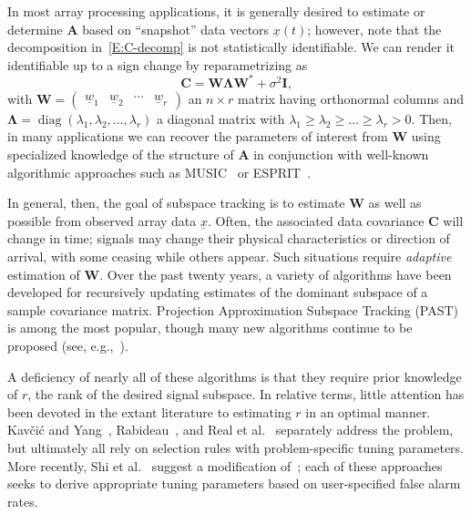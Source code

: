 \documentclass[final]{IEEEtran}
\newcommand{\vectorsymbol}{\underline}
\newcommand{\matrixsymbol}{\boldsymbol}
\newcommand{\mA}{\matrixsymbol{A}}
\newcommand{\mC}{\matrixsymbol{C}}
\newcommand{\mI}{\matrixsymbol{I}}
\newcommand{\mW}{\matrixsymbol{W}}
\newcommand{\mLambda}{\matrixsymbol{\Lambda}}
\newcommand{\vw}{\vectorsymbol{w}}
\newcommand{\vx}{\vectorsymbol{x}}
\DeclareMathOperator*{\diag}{diag}
\begin{document}
In most array processing applications, it is generally desired to estimate or determine $\mA$ based on ``snapshot'' data vectors $\vx(t)$; however, note that the decomposition in~\eqref{E:C-decomp} is not statistically identifiable.  We can render it identifiable up to a sign change by reparametrizing as
\begin{equation}\label{E:C-decomp-eig}
    \mC
    =
    \mW \mLambda \mW^* + \sigma^2 \mI,
\end{equation}
with
\(
    \mW
    =
    \left(
    \begin{matrix}
        \vw_1 & \vw_2 & \cdots & \vw_r
    \end{matrix}
    \right)
\)
an $n \times r$ matrix having orthonormal columns and
\(
    \mLambda
    =
    \diag(
        \lambda_1, \lambda_2, \ldots, \lambda_r
    )
\)
a diagonal matrix with
\(
    \lambda_1 \geq \lambda_2 \geq \dots \geq \lambda_r > 0.
\)
Then, in many applications we can recover the parameters of interest from
$\mW$ using specialized knowledge of the structure of $\mA$ in conjunction with well-known algorithmic approaches
such as MUSIC~\cite{schmidt1986mel} or ESPRIT~\cite{roy1989ees}.

In general, then, the goal of subspace tracking is to estimate $\mW$ as well as
possible from observed array data $\vx$.  Often, the associated data covariance $\mC$ will change in time; signals may change their physical characteristics or direction of arrival, with some ceasing while others appear.  Such situations require \emph{adaptive} estimation of $\mW$.  Over the past twenty years, a variety of algorithms
have been developed for recursively updating estimates of the dominant subspace
of a sample covariance matrix.  Projection Approximation Subspace Tracking (PAST)~\cite{yang1995pas} is among the most popular, though many new algorithms continue to be proposed (see, e.g.,~\cite{badeau2008fas, bartelmaos2008fpc, doukopoulos2008fas}).

A deficiency of nearly all of these algorithms is that they require prior
knowledge of $r$, the rank of the desired signal subspace.  In relative terms, little
attention has been devoted in the extant literature to estimating $r$ in an optimal manner.  Kav\v{c}i\'c and Yang~\cite{kavcic1996are}, Rabideau~\cite{rabideau1996fra}, and Real et al.~\cite{real1999taf} separately address the problem, but ultimately all
rely on selection rules with problem-specific tuning parameters.  More recently,
Shi et al.~\cite{shi2007aen} suggest a modification of~\cite{rabideau1996fra}; each of these approaches seeks to derive appropriate tuning parameters based on
user-specified false alarm rates.
\end{document}
